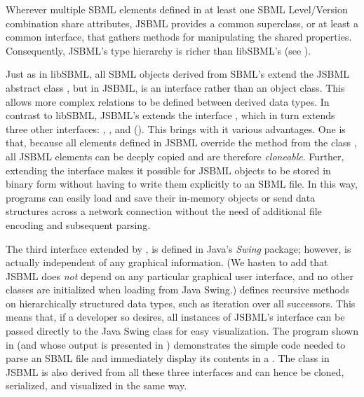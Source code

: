 Wherever multiple SBML elements defined in at least one SBML Level/Version
combination  share attributes, JSBML
 provides a common superclass, or at least a
common interface, that gathers methods for manipulating the shared
properties. Consequently, JSBML's type hierarchy
 is richer than libSBML's (see
).

Just as in libSBML,  all
SBML objects derived from SBML's \SBase extend the JSBML abstract class
\SBase, but in JSBML, \SBase is an interface rather than an object class.
This allows more complex relations to be defined between derived data
types. In contrast to libSBML, JSBML's \SBase extends the interface
\TreeNodeWithChangeSupport, which in turn extends three other interfaces:
\Cloneable, \Serializable, and \TreeNode ().
This brings with it various advantages. One is that, because all elements
defined in JSBML  override the  method from
the class ,  all JSBML
elements can be deeply copied and are therefore \emph{cloneable}. Further,
extending the interface \Serializable makes it possible for JSBML
 objects to be stored in
binary form without having to write them explicitly to an SBML file.
 In this way, programs can easily load and save their
in-memory objects or send data structures across a network connection
without the need of additional file encoding and subsequent parsing.

The third interface extended by \SBase, \TreeNode is defined in Java's
\emph{Swing}  package; however,
\TreeNode is actually independent of any graphical information.  (We hasten
to add that JSBML does \emph{not} depend on any particular graphical user
interface, and no other classes are initialized when loading \TreeNode from
Java Swing.)  \TreeNode defines recursive methods on hierarchically
structured data types, such as iteration over all successors. This means
that, if a developer so desires, all instances of JSBML's \SBase interface
can be passed directly to the Java Swing  class \JTree {} for easy visualization. The program shown in
 (and whose output is presented in
) demonstrates the simple code
needed to parse an SBML file  and immediately display
its contents in a \JFrame. 
The \ASTNode class in JSBML is also derived from all these three interfaces
and can hence be cloned, serialized, and visualized in the same way.

